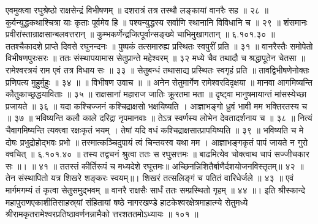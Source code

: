 एवमुक्त्वा रघुश्रेष्ठो राक्षसेन्द्रं विभीषणम् ॥
दशरात्रं तत्र तस्थौ लङ्कायां वानरैः सह ॥ २८ ॥
कुर्वन्युद्धकथाश्चित्रा याः कृताः पूर्वमेव हि ॥
पश्यन्युद्धस्य सर्वाणि स्थानानि विविधानि च ॥ २९ ॥
शंसमानः प्रवीरांस्तान्राक्षसान्बलवत्तरान् ॥
कुम्भकर्णेन्द्रजित्पूर्वान्सङ्ख्ये चाभिमुखागतान् ॥ ६.१०१.३० ॥
ततश्चैकादशे प्राप्ते दिवसे रघुनन्दनः ॥
पुष्पकं तत्समारुह्य प्रस्थितः स्वपुरीं प्रति ॥ ३१ ॥
वानरैस्तैः समोपेतो विभीषणपुरःसरः ॥
ततः संस्थापयामास सेतुप्रान्ते महेश्वरम् ॥ ३२
मध्ये चैव तथादौ च श्रद्धापूतेन चेतसा ॥
रामेश्वरत्रयं राम एवं तत्र विधाय सः ॥ ३३ ॥
सेतुबन्धं तथासाद्य प्रस्थितः स्वगृहं प्रति ॥
तावद्विभीषणेनोक्तः प्रणिपत्य मुहुर्मुहुः ॥ ३४ ॥
॥ विभीषण उवाच ॥ ॥
अनेन सेतुमार्गेण रामेश्वरदिदृक्षया ॥
मानवा आगमिष्यन्ति कौतुकाच्छ्रद्धयाविताः ॥ ३५ ॥
राक्षसानां महाराज जातिः क्रूरतमा मता ॥
दृष्ट्वा मानुषमायान्तं मांसस्येच्छा प्रजायते ॥ ३६ ॥
यदा कश्चिज्जनं कश्चिद्राक्षसो भक्षयिष्यति ।
आज्ञाभङ्गो ध्रुवं भावी मम भक्तिरतस्य च ॥ ३७ ॥
भविष्यन्ति कलौ काले दरिद्रा नृपमानवाः ॥
तेऽत्र स्वर्णस्य लोभेन देवतादर्शनाय च ॥ ३८ ॥
नित्यं चैवागमिष्यन्ति त्यक्त्वा रक्षःकृतं भयम् ।
तेषां यदि वधं कश्चिद्राक्षसात्प्रापयिष्यति ॥ ३९ ॥
भविष्यति च मे दोषः प्रभुद्रोहोद्भवः प्रभो ॥
तस्मात्कञ्चिदुपायं त्वं चिन्तयस्व यथा मम ।
आज्ञाभङ्गकृतं पापं जायते न गुरो क्वचित् ॥ ६.१०१.४० ॥
तस्य तद्वचनं श्रुत्वा ततः स रघुसत्तमः ॥
बाढमित्येव चोक्त्वाथ चापं सज्जीचकार सः ॥। ॥ ४१ ॥
ततस्तं कीर्तिरूपं च मध्यदेशे रघूत्तमः॥
अच्छिनन्निशितैर्बाणैर्दशयोजनविस्तृतम्॥ ४२ ॥
तेन संस्थापितो यत्र शिखरे शङ्करः स्वयम्॥।
शिखरं तत्सलिङ्गं च पतितं वारिधेर्जले ॥ ४३ ॥
एवं मार्गमगम्यं तं कृत्वा सेतुसमुद्भवम् ॥
वानरै राक्षसैः सार्धं ततः सम्प्रस्थितो गृहम् ॥ ४४ ॥।
इति श्रीस्कान्दे महापुराणएकाशीतिसाहस्र्यां संहितायां षष्ठे नागरखण्डे हाटकेश्वरक्षेत्रमाहात्म्ये सेतुमध्ये श्रीरामकृतरामेश्वरप्रतिष्ठावर्णनन्नामैको त्तरशततमोऽध्यायः ॥ १०१ ॥

